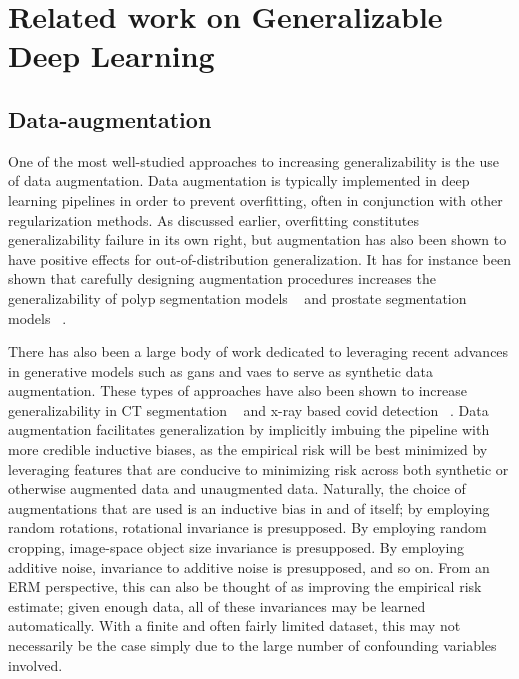 \section{Related work on Generalizable Deep Learning}





\subsection{Data-augmentation}
One of the most well-studied approaches to increasing generalizability is the use of data augmentation. Data augmentation is typically
implemented in deep learning pipelines in order to prevent overfitting, often in conjunction with other regularization methods. As discussed earlier, overfitting constitutes generalizability failure in its own right, but augmentation has also been shown to have positive effects for out-of-distribution generalization. It has for instance been shown that carefully designing augmentation procedures increases the generalizability of polyp segmentation models ~\cite{polyp_augmentation} and prostate segmentation models ~\cite{augmentation_prostate}. 


There has also been a large body of work dedicated to leveraging recent advances in generative models such as \glspl{gan} and \glspl{vae} to serve as synthetic data augmentation. These types of approaches have also been shown to increase generalizability in CT segmentation ~\cite{cyclegan} and x-ray based covid detection ~\cite{covid}. Data augmentation facilitates generalization by implicitly imbuing the pipeline with more credible inductive biases, as the empirical risk will be best minimized by leveraging features that are conducive to minimizing risk across both synthetic or otherwise augmented data and unaugmented data. Naturally, the choice of augmentations that are used is an inductive bias in and of itself; by employing random rotations, rotational invariance is presupposed. By employing random cropping, image-space object size invariance is presupposed. By employing additive noise, invariance to additive noise is presupposed, and so on. From an ERM perspective, this can also be thought of as improving the empirical risk estimate; given enough data, all of these invariances may be learned automatically. With a finite and often fairly limited dataset, this may not necessarily be the case simply due to the large number of confounding variables involved. 

